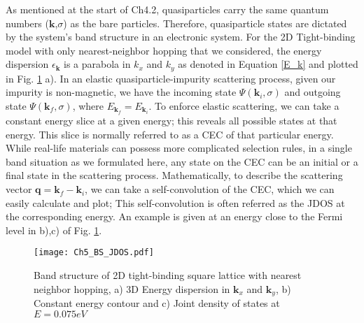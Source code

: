 As mentioned at the start of Ch4.2, quasiparticles carry the same quantum numbers ($\textbf{k}$,$\sigma$) as the bare particles. Therefore, quasiparticle states are dictated by the system's band structure in an electronic system. For the 2D Tight-binding model with only nearest-neighbor hopping that we considered, the energy dispersion $\epsilon_{\mathbf{k}}$ is a parabola in $k_x$ and $k_y$ as denoted in Equation \ref{E_k} and plotted in Fig. \ref{fig:ch5_bs} a). In an elastic quasiparticle-impurity scattering process, given our impurity is non-magnetic, we have the incoming state $\Psi(\textbf{k}_i,\sigma)$ and outgoing state $\Psi(\textbf{k}_f,\sigma)$, where $E_{\textbf{k}_f} = E_{\textbf{k}_i}$. To enforce elastic scattering, we can take a constant energy slice at a given energy; this reveals all possible states at that energy. This slice is normally referred to as a \ac{CEC} of that particular energy. While real-life materials can possess more complicated selection rules, in a single band situation as we formulated here, any state on the \ac{CEC} can be an initial or a final state in the scattering process. Mathematically, to describe the scattering vector $\textbf{q} = \textbf{k}_f -\textbf{k}_i$, we can take a self-convolution of the \ac{CEC}, which we can easily calculate and plot; This self-convolution is often referred as the \ac{JDOS} at the corresponding energy. An example is given at an energy close to the Fermi level in b),c) of Fig. \ref{fig:ch5_bs}. 
\begin{figure}
	\centering
	\texttt{[image: Ch5\_BS\_JDOS.pdf]} 
	\caption{Band structure of 2D tight-binding square lattice with nearest neighbor hopping, a) 3D Energy dispersion in $\textbf{k}_x$ and $\textbf{k}_y$, b) Constant energy contour and c) Joint density of states at $E=0.075eV$}
	\label{fig:ch5_bs}
\end{figure}

